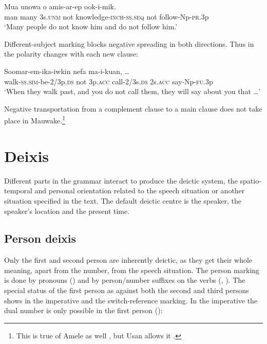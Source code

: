 \ea%
\label{ex:x1139}
\gll Mua  unowa  o    amis-ar-ep   ook-i-mik.\\
man  many  3s.\textsc{unm}  not  knowledge-\textsc{inch}-\textsc{ss}.\textsc{seq} not  follow-Np-\textsc{pr}.3p\\
\glt `Many people do not know him and do not follow him.'
\z

Different-subject marking blocks negative spreading in both directions. Thus in  the polarity changes with each new clause:

\ea%
\label{ex:x1141}
\gll Soomar-em-ika-iwkin      nefa  ma-i-kuan, {\dots}\\
walk-\textsc{ss}.\textsc{sim}-be-2/3p.\textsc{ds}  not  3p.\textsc{acc}  call-2/3s.\textsc{ds} 2s.\textsc{acc}  say-Np-\textsc{fu}.3p\\
\glt `When they walk past, and you do not call them, they will say about you that {\dots}'
\z

Negative transportation from a complement clause to a main clause does not take place in Mauwake.\footnote{This is true of Amele as well \citep[44]{Roberts1987}, but Usan allows it \citep[278--280]{Reesink1987}.} 

\section{Deixis} 
{}
Different parts in the grammar interact to produce the deictic system, the spatio-temporal and personal orientation related to the speech situation or another situation specified in the text. The default deictic centre is the speaker, the speaker's location and the present time.  

\subsection{Person deixis}
{}
Only the first and second person are inherently deictic, as they get their whole meaning, apart from the number, from the speech situation. The person marking is done by pronouns () and by person/number suffixes on the verbs (, ). The special status of the first person as against both the second and third persons shows in the imperative and the switch-reference marking. In the imperative the dual number is only possible in the first person (): 

